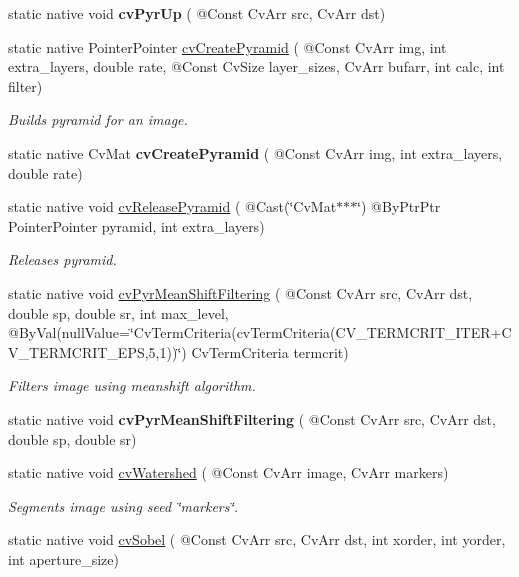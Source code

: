 \begin{DoxyCompactItemize}
static native void {\bfseries cv\+Pyr\+Up} ( @Const Cv\+Arr src, Cv\+Arr dst)
\item 
static native Pointer\+Pointer \hyperlink{group__imgproc__c_gad819c70ae44efaea82dfbf9745633179}{cv\+Create\+Pyramid} ( @Const Cv\+Arr img, int extra\+\_\+layers, double rate, @Const Cv\+Size layer\+\_\+sizes, Cv\+Arr bufarr, int calc, int filter)
\begin{DoxyCompactList}\small\item\em Builds pyramid for an image. \end{DoxyCompactList}\item 
static native Cv\+Mat {\bfseries cv\+Create\+Pyramid} ( @Const Cv\+Arr img, int extra\+\_\+layers, double rate)
\item 
static native void \hyperlink{group__imgproc__c_gafedcfec1793dc4d6dd6e5c97d4fb30a0}{cv\+Release\+Pyramid} ( @Cast(\char`\"{}Cv\+Mat$\ast$$\ast$$\ast$\char`\"{}) @By\+Ptr\+Ptr Pointer\+Pointer pyramid, int extra\+\_\+layers)
\begin{DoxyCompactList}\small\item\em Releases pyramid. \end{DoxyCompactList}\item 
static native void \hyperlink{group__imgproc__c_ga03ca86df80599c20db2980fb4a3eeed2}{cv\+Pyr\+Mean\+Shift\+Filtering} ( @Const Cv\+Arr src, Cv\+Arr dst, double sp, double sr, int max\+\_\+level, @By\+Val(null\+Value=\char`\"{}Cv\+Term\+Criteria(cv\+Term\+Criteria(C\+V\+\_\+\+T\+E\+R\+M\+C\+R\+I\+T\+\_\+\+I\+T\+ER+C\+V\+\_\+\+T\+E\+R\+M\+C\+R\+I\+T\+\_\+\+E\+PS,5,1))\char`\"{}) Cv\+Term\+Criteria termcrit)
\begin{DoxyCompactList}\small\item\em Filters image using meanshift algorithm. \end{DoxyCompactList}\item 
static native void {\bfseries cv\+Pyr\+Mean\+Shift\+Filtering} ( @Const Cv\+Arr src, Cv\+Arr dst, double sp, double sr)
\item 
static native void \hyperlink{group__imgproc__c_gae7b6a113cdd9df18a224597d7e034810}{cv\+Watershed} ( @Const Cv\+Arr image, Cv\+Arr markers)
\begin{DoxyCompactList}\small\item\em Segments image using seed \char`\"{}markers\char`\"{}. \end{DoxyCompactList}\item 
static native void \hyperlink{group__imgproc__c_ga8ef9469a1ca3c2940511a7f390eb6fb3}{cv\+Sobel} ( @Const Cv\+Arr src, Cv\+Arr dst, int xorder, int yorder, int aperture\+\_\+size)

\end{DoxyCompactItemize}

